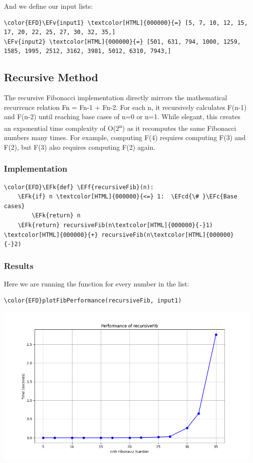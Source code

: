 \documentclass[a4paper,12pt]{article}
\newcommand{\EFc}[1]{\textcolor{EFc}{#1}} %
\newcommand{\EFcd}[1]{\textcolor{EFcd}{#1}} %
\newcommand{\EFk}[1]{\textcolor{EFk}{#1}} %
\newcommand{\EFf}[1]{\textcolor{EFf}{#1}} %
\newcommand{\EFv}[1]{\textcolor{EFv}{#1}} %
\begin{document}
And we define our input lists:
\begin{Code}
\begin{Verbatim}
\color{EFD}\EFv{input1} \textcolor[HTML]{000000}{=} [5, 7, 10, 12, 15, 17, 20, 22, 25, 27, 30, 32, 35,]
\EFv{input2} \textcolor[HTML]{000000}{=} [501, 631, 794, 1000, 1259, 1585, 1995, 2512, 3162, 3981, 5012, 6310, 7943,]
\end{Verbatim}
\end{Code}
\subsection{Recursive Method}
\label{sec:org3b53166}
The recursive Fibonacci implementation directly mirrors the mathematical recurrence relation Fn = Fn-1 + Fn-2. For each n, it recursively calculates F(n-1) and F(n-2) until reaching base cases of n=0 or n=1. While elegant, this creates an exponential time complexity of O(2\textsuperscript{n}) as it recomputes the same Fibonacci numbers many times. For example, computing F(4) requires computing F(3) and F(2), but F(3) also requires computing F(2) again.
\subsubsection{Implementation}
\label{sec:org05846e4}
\begin{Code}
\begin{Verbatim}
\color{EFD}\EFk{def} \EFf{recursiveFib}(n):
    \EFk{if} n \textcolor[HTML]{000000}{<=} 1:  \EFcd{\# }\EFc{Base cases}
        \EFk{return} n
    \EFk{return} recursiveFib(n\textcolor[HTML]{000000}{-}1) \textcolor[HTML]{000000}{+} recursiveFib(n\textcolor[HTML]{000000}{-}2)
\end{Verbatim}
\end{Code}
\subsubsection{Results}
\label{sec:org8aa1fea}
Here we are running the function for every number in the list:
\begin{Code}
\begin{Verbatim}
\color{EFD}plotFibPerformance(recursiveFib, input1)
\end{Verbatim}
\end{Code}

\begin{center}
\includegraphics[width=.9\linewidth]{recursiveFib.png}
\label{orga327050}
\end{center}
\end{document}
